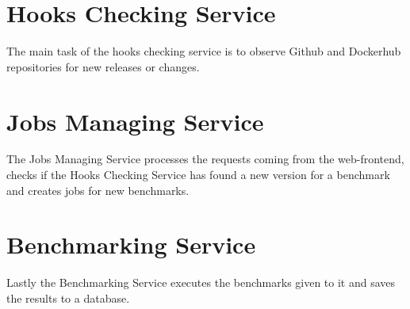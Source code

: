 \section{Hooks Checking Service}
\label{sec:hooks_checking_service}
The main task of the hooks checking service is to observe Github and Dockerhub repositories for new releases or changes.


\section{Jobs Managing Service}
\label{sec:jobs_managing_service}
The Jobs Managing Service processes the requests coming from the web-frontend, checks if the Hooks Checking Service has found a new version for a benchmark and creates jobs for new benchmarks.


\section{\ts{} Benchmarking Service}
\label{sec:ts_benchmarking_service}
Lastly the \ts{} Benchmarking Service executes the benchmarks given to it and saves the results to a database.